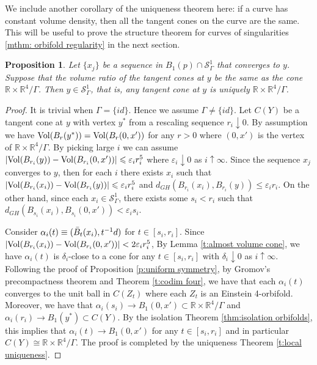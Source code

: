 \documentclass[11pt,reqno]{amsart}
\numberwithin{equation}{section}
\newcommand{\RR}{\mathds{R}}
\newcommand{\Vol}{{\rm Vol}}
\newcommand{\cS}{\mathcal{S}}
\newtheorem{proposition}[thm]{Proposition}
\theoremstyle{definition}
\theoremstyle{remark}
\begin{document}
We include another corollary of the uniqueness theorem here: if a curve has constant volume density, then all the tangent cones on the curve are the same. This will be useful to prove the structure theorem for curves of singularities \ref{mthm: orbifold regularity} in the next section. 

\begin{proposition}\label{p:tangent cone is continuous under constant volume ratio}
    Let $\{x_j\}$ be a sequence in $B_1(p)\cap \cS_{\Gamma}^1$ that converges to $y$. Suppose that the volume ratio of the tangent cones at $y$ be the same as the cone $\RR \times \RR^4/\Gamma$. Then $y \in \cS^1_{\Gamma}$, that is, any tangent cone at $y$ is uniquely $\RR \times \RR^4/\Gamma$.
\end{proposition}

\begin{proof}
    It is trivial when $\Gamma = \{id\}$. Hence we assume $\Gamma \neq \{id\}$. Let $C(Y)$ be a tangent cone at $y$ with vertex $y^*$ from a rescaling sequence $r_i \downarrow 0$. By assumption we have $\Vol(B_r(y^*)) = \Vol(B_r(0,x'))$ for any $r>0$ where $(0,x')$ is the vertex of $\RR \times \RR^4/\Gamma$. By picking large $i$ we can assume $|\Vol(B_{r_i}(y)) - \Vol(B_{r_i}(0,x'))| \leqslant \varepsilon_i r_i^5$ where $\varepsilon_i \downarrow 0$ as $i \uparrow \infty$. Since the sequence $x_j$ converges to $y$, then for each $i$ there exists $x_i$ such that $|\Vol(B_{r_i}(x_i)) - \Vol(B_{r_i}(y))| \leqslant \varepsilon_i r_i^5$ and $d_{GH}(B_{r_i}(x_i), B_{r_i}(y)) \leqslant \varepsilon_i r_i$. On the other hand, since each $x_i \in \cS^1_{\Gamma}$, there exists some $s_i < r_i$ such that $d_{GH}(B_{s_i}(x_i), B_{s_i}(0,x')) < \varepsilon_i s_i$. 

    Consider $\alpha_{i}(t) \equiv (\Bar{B}_t(x_i), t^{-1}d)$ for $t \in [s_i, r_i]$. Since $|\Vol(B_{r_i}(x_i)) - \Vol(B_{r_i}(0,x'))| < 2\varepsilon_i  r_i^5$, By Lemma \ref{t:almost volume cone}, we have $\alpha_i(t)$ is $\delta_i$-close to a cone for any $t \in [s_i,r_i]$ with $\delta_i \downarrow 0$ as $i \uparrow \infty$. Following the proof of Proposition \ref{p:uniform symmetry}, by Gromov's precompactness theorem and Theorem \ref{t:codim four}, we have that each $\alpha_i(t)$ converges to the unit ball in $C(Z_t)$ where each $Z_t$ is an Einstein 4-orbifold. Moreover, we have that $\alpha_i(s_i) \to B_1(0,x') \subset \RR \times \RR^4/\Gamma$ and $\alpha_i(r_i) \to B_1(y^*) \subset C(Y)$. By the isolation Theorem \ref{thm:isolation orbifolds}, this implies that $\alpha_i(t) \to B_1(0,x')$ for any $t\in [s_i,r_i]$ and in particular $C(Y) \cong \RR \times \RR^4/\Gamma$. The proof is completed by the uniqueness Theorem \ref{t:local uniqueness}.
\end{proof}
\end{document}
